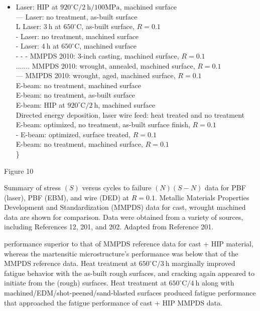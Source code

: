 \documentclass[10pt]{article}
\begin{document}
\begin{itemize}
  \item Laser: HIP at $920^{\circ} \mathrm{C} / 2 \mathrm{~h} / 100 \mathrm{MPa}$, machined surface \\
 — Laser: no treatment, as-built surface \\
 L Laser: $3 \mathrm{~h}$ at $650^{\circ} \mathrm{C}$, as-built surface, $R=0.1$ \\
 - Laser: no treatment, machined surface \\
 - Laser: $4 \mathrm{~h}$ at $650^{\circ} \mathrm{C}$, machined surface \\
 - - - MMPDS 2010: 3-inch casting, machined surface, $R=0.1$ \\
 ....... MMPDS 2010: wrought, annealed, machined surface, $R=0.1$ \\
 --- MMPDS 2010: wrought, aged, machined surface, $R=0.1$ \\
 E-beam: no treatment, machined surface \\
 E-beam: no treatment, as-built surface \\
 E-beam: HIP at $920^{\circ} \mathrm{C} / 2 \mathrm{~h}$, machined surface \\
 Directed energy deposition, laser wire feed: heat treated and no treatment \\
 E-beam: optimized, no treatment, as-built surface finish, $R=0.1$ \\
 - E-beam: optimized, surface treated, $R=0.1$ \\
 E-beam: no treatment, machined surface, $R=0.1$\\
\}
\end{itemize}

Figure 10

Summary of stress $(S)$ versus cycles to failure $(N)(S-N)$ data for PBF (laser), PBF (EBM), and wire (DED) at $R=0.1$. Metallic Materials Properties Development and Standardization (MMPDS) data for cast, wrought machined data are shown for comparison. Data were obtained from a variety of sources, including References 12, 201, and 202. Adapted from Reference 201.

performance superior to that of MMPDS reference data for cast + HIP material, whereas the martensitic microstructure's performance was below that of the MMPDS reference data. Heat treatment at $650^{\circ} \mathrm{C} / 3 \mathrm{~h}$ marginally improved fatigue behavior with the as-built rough surfaces, and cracking again appeared to initiate from the (rough) surfaces. Heat treatment at $650^{\circ} \mathrm{C} / 4 \mathrm{~h}$ along with machined/EDM/shot-peened/sand-blasted surfaces produced fatigue performance that approached the fatigue performance of cast + HIP MMPDS data.
\end{document}
